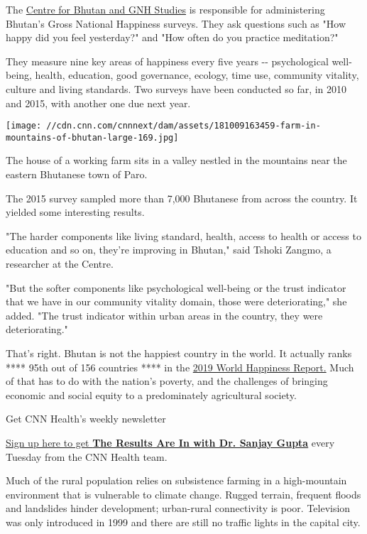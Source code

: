 The \href{https://www.bhutanstudies.org.bt/}{Centre for Bhutan and GNH
Studies} is responsible for administering Bhutan's Gross National
Happiness surveys. They ask questions such as "How happy did you feel
yesterday?" and "How often do you practice meditation?"

They measure nine key areas of happiness every five years -\/-
psychological well-being, health, education, good governance, ecology,
time use, community vitality, culture and living standards. Two surveys
have been conducted so far, in 2010 and 2015, with another one due next
year.

\texttt{[image: //cdn.cnn.com/cnnnext/dam/assets/181009163459-farm-in-mountains-of-bhutan-large-169.jpg]}

The house of a working farm sits in a valley nestled in the mountains
near the eastern Bhutanese town of Paro.

The 2015 survey sampled more than 7,000 Bhutanese from across the
country. It yielded some interesting results.

"The harder components like living standard, health, access to health or
access to education and so on, they're improving in Bhutan," said Tshoki
Zangmo, a researcher at the Centre.

"But the softer components like psychological well-being or the trust
indicator that we have in our community vitality domain, those were
deteriorating," she added. "The trust indicator within urban areas in
the country, they were deteriorating."

That's right. Bhutan is not the happiest country in the world. It
actually ranks **** 95th out of 156 countries **** in the
\href{https://worldhappiness.report/}{2019 World Happiness Report.} Much
of that has to do with the nation's poverty, and the challenges of
bringing economic and social equity to a predominately agricultural
society.

Get CNN Health's weekly newsletter

\href{https://mailchi.mp/cnn/resultsarein}{Sign up here to get
\textbf{The Results Are In with Dr. Sanjay Gupta}} every Tuesday from
the CNN Health team.

Much of the rural population relies on subsistence farming in a
high-mountain environment that is vulnerable to climate change. Rugged
terrain, frequent floods and landslides hinder development; urban-rural
connectivity is poor. Television was only introduced in 1999 and there
are still no traffic lights in the capital city.

